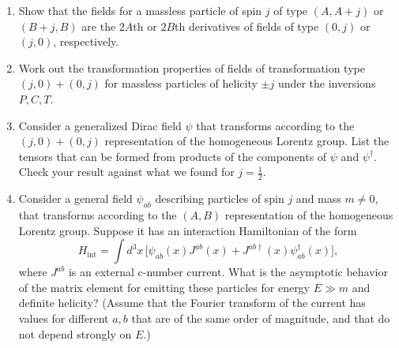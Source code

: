 \begin{enumerate}
\item Show that the fields for a massless particle of spin $j$ of type
$(A,A+j)$ or $(B+j,B)$ are the $2A$th or $2B$th derivatives of fields of
type $(0,j)$ or $(j,0)$, respectively.

\item Work out the transformation properties of fields of transformation
type $(j,0)+(0,j)$ for massless particles of helicity $\pm j$ under the
inversions $P,C,T$.

\item Consider a generalized Dirac field $\psi$ that transforms according to
the $(j,0)+(0,j)$ representation of the homogeneous Lorentz group. List the
tensors that can be formed from products of the components of $\psi$ and
$\psi^\dagger$. Check your result against what we found for $j=\tfrac12$.

\item Consider a general field $\psi_{ab}$ describing particles of spin $j$
and mass $m\ne0$, that transforms according to the $(A,B)$ representation of
the homogeneous Lorentz group. Suppose it has an interaction Hamiltonian of
the form
\[
  H_{\mathrm{int}}=\int d^3x\,
  \bigl[\psi_{ab}(x)J^{ab}(x)
    +J^{ab\dagger}(x)\psi_{ab}^\dagger(x)\bigr],
\]
where $J^{ab}$ is an external c-number current. What is the asymptotic
behavior of the matrix element for emitting these particles for energy
$E\gg m$ and definite helicity? (Assume that the Fourier transform of the
current has values for different $a,b$ that are of the same order of
magnitude, and that do not depend strongly on $E$.)
\end{enumerate}


